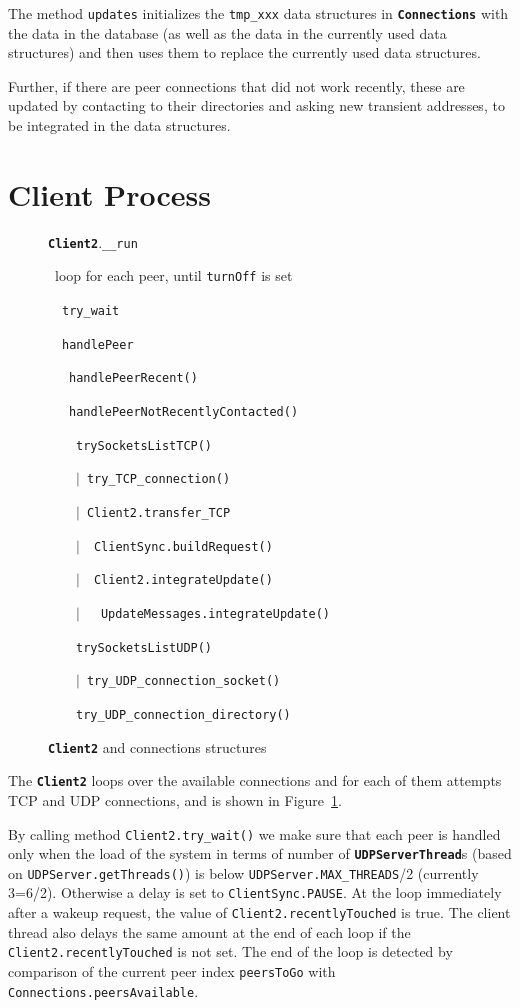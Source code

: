 \documentclass{book}
\newcommand{\cls}[1]{{\tt\bf #1}}
\newcommand{\mth}[1]{{\tt #1}}
\newcommand{\mmb}[1]{{\tt #1}}
\begin{document}
The method \mth{updates} initializes the \mmb{tmp\_xxx} data structures in \cls{Connections} with the data in the database 
(as well as the data in the currently used data structures) and then uses them to replace the currently used data structures.

Further, if there are peer connections that did not work recently, these are updated by contacting to their directories and asking
new transient addresses, to be integrated in the data structures.


\section{Client Process}

\begin{figure}[!ht]
\noindent
\strut\cls{Client2}.\mth{\_\_run} \\
\strut~loop for each peer, until \mmb{turnOff} is set \\
\strut~~\mth{try\_wait} \\
\strut~~\mth{handlePeer} \\
\strut~~~\mth{handlePeerRecent()} \\
\strut~~~\mth{handlePeerNotRecentlyContacted()} \\
\strut~~~~\mth{trySocketsListTCP()} \\
\strut~~~~$|$~\mth{try\_TCP\_connection()} \\
\strut~~~~$|$~\mth{Client2.transfer\_TCP} \\
\strut~~~~$|$~~\mth{ClientSync.buildRequest()} \\
\strut~~~~$|$~~\mth{Client2.integrateUpdate()} \\
\strut~~~~$|$~~~\mth{UpdateMessages.integrateUpdate()} \\
\strut~~~~\mth{trySocketsListUDP()} \\
\strut~~~~$|$~\mth{try\_UDP\_connection\_socket()} \\
\strut~~~~\mth{try\_UDP\_connection\_directory()} \\
\caption{\cls{Client2} and connections structures}\label{fig:conn_client2}
\end{figure}

The \cls{Client2} loops over the available connections and for each of them attempts TCP and UDP connections,
and is shown in Figure~\ref{fig:conn_client2}.

By calling method \mth{Client2.try\_wait()} we make sure that
each peer is handled only when the load of the system in terms of number of \cls{UDPServerThread}s (based on \mth{UDPServer.getThreads()}) is below 
\mmb{UDPServer.MAX\_THREADS}/2 (currently 3=6/2). Otherwise a delay is set to \mmb{ClientSync.PAUSE}.
At the loop immediately after a wakeup request, the value of \mmb{Client2.recentlyTouched} is true.
The client thread also delays the same amount at the end of each loop if the \mmb{Client2.recentlyTouched} is not set.
The end of the loop is detected by comparison of the current peer index \mmb{peersToGo} with \mmb{Connections.peersAvailable}.
\end{document}
